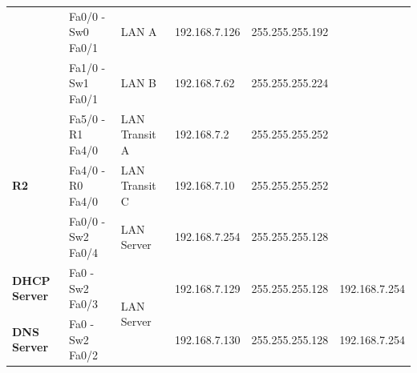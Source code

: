 \documentclass[11pt,a4paper]{report}
\begin{document}
\begin{center}
\begin{longtable}{@{}llllll@{}}
                                                               & Fa0/0 - Sw0 Fa0/1                                        & LAN A                                                 & 192.168.7.126                                    & 255.255.255.192                                           &                                                       \\* \cmidrule(l){2-6}
                                                               & Fa1/0 - Sw1 Fa0/1                                        & LAN B                                                 & 192.168.7.62                                     & 255.255.255.224                                           &                                                       \\* \midrule
            \multirow{3}{*}{\textbf{R2}}                       & Fa5/0 - R1 Fa4/0                                         & LAN Transit A                                         & 192.168.7.2                                      & 255.255.255.252                                           &                                                       \\* \cmidrule(l){2-6}
                                                               & Fa4/0 - R0 Fa4/0                                         & LAN Transit C                                         & 192.168.7.10                                     & 255.255.255.252                                           &                                                       \\* \cmidrule(l){2-6}
                                                               & Fa0/0 - Sw2 Fa0/4                                        & LAN Server                                            & 192.168.7.254                                    & 255.255.255.128                                           &                                                       \\* \midrule
            \textbf{DHCP Server}                               & Fa0 - Sw2 Fa0/3                                          & \multirow{3}{*}{LAN Server}                           & 192.168.7.129                                    & 255.255.255.128                                           & 192.168.7.254                                         \\* \cmidrule(r){1-2} \cmidrule(l){4-6}
            \textbf{DNS Server}                                & Fa0 - Sw2 Fa0/2                                          &                                                       & 192.168.7.130                                    & 255.255.255.128                                           & 192.168.7.254                                         \\* \cmidrule(r){1-2} \cmidrule(l){4-6}

\end{longtable}
\end{center}
\end{document}
